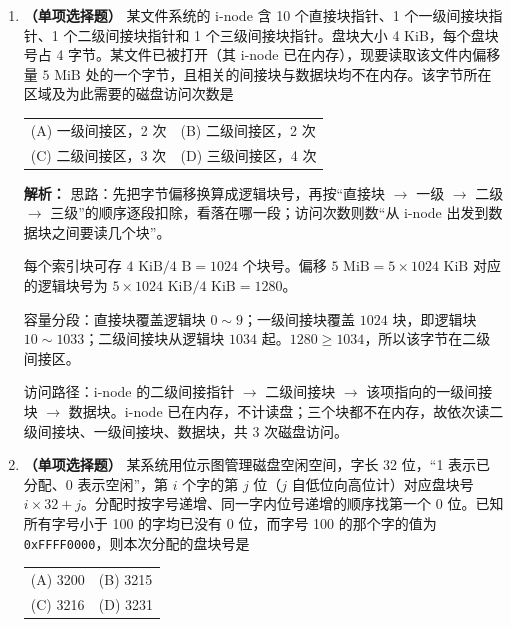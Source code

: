 \begin{enumerate}[start=7]

\item \textbf{（单项选择题）} 某文件系统的 i-node 含 10 个直接块指针、1 个一级间接块指针、1 个二级间接块指针和 1 个三级间接块指针。盘块大小 4 KiB，每个盘块号占 4 字节。某文件已被打开（其 i-node 已在内存），现要读取该文件内偏移量 $5\text{ MiB}$ 处的一个字节，且相关的间接块与数据块均不在内存。该字节所在区域及为此需要的磁盘访问次数是
\begin{center}
\begin{tabular}{ll}
(A) 一级间接区，2 次 & (B) 二级间接区，2 次 \\[4pt]
(C) 二级间接区，3 次 & (D) 三级间接区，4 次
\end{tabular}
\end{center}

\ifshowsolutions\par\noindent\textbf{解析：} 思路：先把字节偏移换算成逻辑块号，再按“直接块 $\to$ 一级 $\to$ 二级 $\to$ 三级”的顺序逐段扣除，看落在哪一段；访问次数则数“从 i-node 出发到数据块之间要读几个块”。

每个索引块可存 $4\text{ KiB}/4\text{ B}=1024$ 个块号。偏移 $5\text{ MiB}=5\times 1024\text{ KiB}$ 对应的逻辑块号为 $5\times 1024\text{ KiB}/4\text{ KiB}=1280$。

容量分段：直接块覆盖逻辑块 $0\sim 9$；一级间接块覆盖 $1024$ 块，即逻辑块 $10\sim 1033$；二级间接块从逻辑块 $1034$ 起。$1280\ge 1034$，所以该字节在二级间接区。

访问路径：i-node 的二级间接指针 $\to$ 二级间接块 $\to$ 该项指向的一级间接块 $\to$ 数据块。i-node 已在内存，不计读盘；三个块都不在内存，故依次读二级间接块、一级间接块、数据块，共 3 次磁盘访问。\else \answerarea \fi

\vspace{8pt}

\item \textbf{（单项选择题）} 某系统用位示图管理磁盘空闲空间，字长 32 位，“1 表示已分配、0 表示空闲”，第 $i$ 个字的第 $j$ 位（$j$ 自低位向高位计）对应盘块号 $i\times 32+j$。分配时按字号递增、同一字内位号递增的顺序找第一个 0 位。已知所有字号小于 100 的字均已没有 0 位，而字号 100 的那个字的值为 \texttt{0xFFFF0000}，则本次分配的盘块号是
\begin{center}
\begin{tabular}{ll}
(A) 3200 & (B) 3215 \\[4pt]
(C) 3216 & (D) 3231
\end{tabular}
\end{center}


\end{enumerate}
